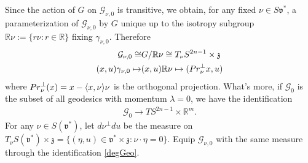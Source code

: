\documentclass[11pt]{amsart}
\theoremstyle{plain}
\theoremstyle{definition}
\theoremstyle{remark}
\numberwithin{equation}{section}
\def\fz{\mathfrak{z}}
\def\fv{\mathfrak{v}}
\def\cG{\mathcal{G}}
\def\R{{\mathbb R}}%
\numberwithin{equation}{section}
\begin{document}
Since the action of $G$ on $\cG_{\nu, 0}$ is transitive, we obtain, for any fixed $\nu\in S\fv^*$, a parameterization of $\cG_{\nu, 0}$ by $G$ unique up to the isotropy subgroup $\R \nu:=\{r\nu: r\in \R\}$ fixing $\gamma_{\nu, 0}$. Therefore
\begin{align}\label{degGeo}
	\cG_{\nu, 0}\cong &G/\R\nu\cong T_\nu S^{2n-1}\times\fz\\
	\nonumber (x, u)\gamma_{\nu, 0}\mapsto &(x, u)\R\nu \mapsto ({{\rm Pr}}_\nu^\perp x, u)
\end{align}
where ${{\rm Pr}}_\nu^\perp(x)=x-\langle x, \nu\rangle \nu$ is the orthogonal projection. 
What's more, if $\cG_0$ is the subset of all geodesics with momentum $\lambda=0$, we have the identification
\begin{align*}
	\cG_0\to TS^{2n-1}\times \R^m. 
\end{align*}
For any $\nu\in S(\fv^*)$, let $d\nu^\perp du$ be the measure on $T_\nu S(\fv^*)\times\fz=\{(\eta, u)\in \fv^*\times\fz: \nu\cdot\eta=0\}$. Equip $\cG_{\nu, 0}$ with the same measure through the identification \eqref{degGeo}.
\end{document}
